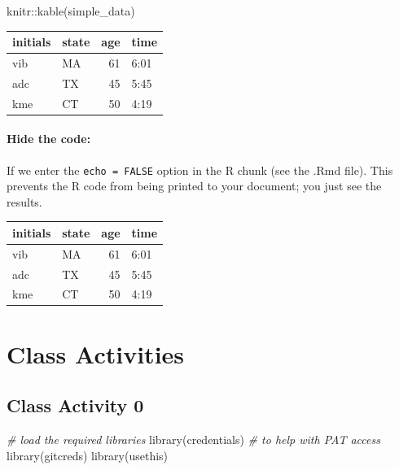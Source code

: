 \documentclass[
]{book}
\newenvironment{Shaded}{\begin{snugshade}}{\end{snugshade}}
\newcommand{\CommentTok}[1]{\textcolor[rgb]{0.56,0.35,0.01}{\textit{#1}}}
\newcommand{\FunctionTok}[1]{\textcolor[rgb]{0.00,0.00,0.00}{#1}}
\newcommand{\NormalTok}[1]{#1}
\newcommand{\SpecialCharTok}[1]{\textcolor[rgb]{0.00,0.00,0.00}{#1}}
\begin{document}
\begin{Shaded}
\begin{Highlighting}[]
\NormalTok{knitr}\SpecialCharTok{::}\FunctionTok{kable}\NormalTok{(simple\_data)}
\end{Highlighting}
\end{Shaded}

\begin{tabular}{l|l|r|l}
\hline
initials & state & age & time\\
\hline
vib & MA & 61 & 6:01\\
\hline
adc & TX & 45 & 5:45\\
\hline
kme & CT & 50 & 4:19\\
\hline
\end{tabular}

\hypertarget{hide-the-code}{%
\subsection{Hide the code:}\label{hide-the-code}}

If we enter the \texttt{echo\ =\ FALSE} option in the R chunk (see the .Rmd file). This prevents the R code from being printed to your document; you just see the results.

\begin{tabular}{l|l|r|l}
\hline
initials & state & age & time\\
\hline
vib & MA & 61 & 6:01\\
\hline
adc & TX & 45 & 5:45\\
\hline
kme & CT & 50 & 4:19\\
\hline
\end{tabular}

\hypertarget{part-class-activities}{%
\part*{Class Activities}\label{part-class-activities}}

\hypertarget{class-activity-0}{%
\chapter{Class Activity 0}\label{class-activity-0}}

\begin{Shaded}
\begin{Highlighting}[]
\CommentTok{\# load the required libraries}
\FunctionTok{library}\NormalTok{(credentials) }\CommentTok{\# to help with PAT access}
\FunctionTok{library}\NormalTok{(gitcreds)}
\FunctionTok{library}\NormalTok{(usethis)}
\end{Highlighting}
\end{Shaded}
\end{document}
